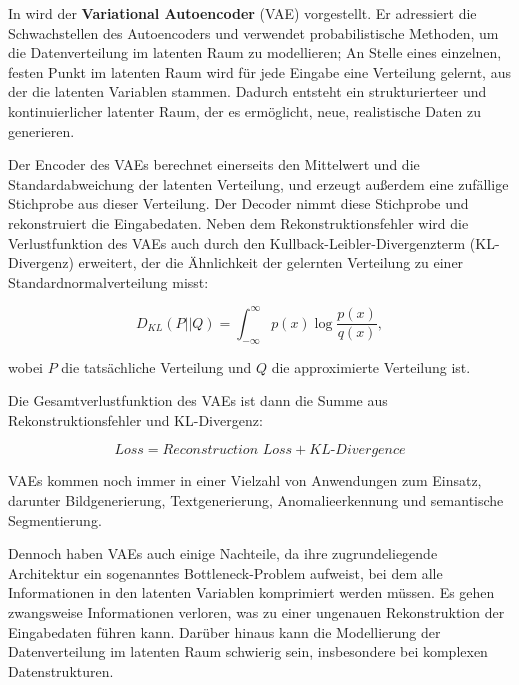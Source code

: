 In \parencite{Kingma2022vae} wird der \textbf{Variational Autoencoder} (VAE) vorgestellt. Er adressiert die Schwachstellen des Autoencoders und verwendet probabilistische Methoden, um die Datenverteilung im latenten Raum zu modellieren; An Stelle eines einzelnen, festen Punkt im latenten Raum wird für jede Eingabe eine Verteilung gelernt, aus der die latenten Variablen stammen. Dadurch entsteht ein strukturierteer und kontinuierlicher latenter Raum, der es ermöglicht, neue, realistische Daten zu generieren.

Der Encoder des VAEs berechnet einerseits den Mittelwert und die Standardabweichung der latenten Verteilung, und erzeugt außerdem eine zufällige Stichprobe aus dieser Verteilung. Der Decoder nimmt diese Stichprobe und rekonstruiert die Eingabedaten. Neben dem Rekonstruktionsfehler wird die Verlustfunktion des VAEs auch durch den Kullback-Leibler-Divergenzterm (KL-Divergenz) erweitert, der die Ähnlichkeit der gelernten Verteilung zu einer Standardnormalverteilung misst:

\begin{equation}
	D_{KL}(P||Q) = \int_{-\infty}^{\infty} p(x) \log \frac{p(x)}{q(x)},
	\label{eq:kl-divergence}
\end{equation}

wobei $P$ die tatsächliche Verteilung und $Q$ die approximierte Verteilung ist.

Die Gesamtverlustfunktion des VAEs ist dann die Summe aus Rekonstruktionsfehler und KL-Divergenz:

\begin{equation}
	Loss = \textit{Reconstruction Loss} + \textit{KL-Divergence}
	\label{eq:loss-vae}
\end{equation}

VAEs kommen noch immer in einer Vielzahl von Anwendungen zum Einsatz, darunter Bildgenerierung, Textgenerierung, Anomalieerkennung und semantische Segmentierung. \parencite{}

Dennoch haben VAEs auch einige Nachteile, da ihre zugrundeliegende Architektur ein sogenanntes Bottleneck-Problem aufweist, bei dem alle Informationen in den latenten Variablen komprimiert werden müssen. Es gehen zwangsweise Informationen verloren, was zu einer ungenauen Rekonstruktion der Eingabedaten führen kann. Darüber hinaus kann die Modellierung der Datenverteilung im latenten Raum schwierig sein, insbesondere bei komplexen Datenstrukturen. \parencite{}

